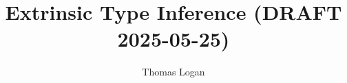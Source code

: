 \documentclass[acmsmall]{acmart}
\title{Extrinsic Type Inference (DRAFT 2025-05-25)}
\author{Thomas Logan}
\newcounter{pdc}
\newcounter{sdc}
\theoremstyle{definition}
\begin{document}
\newcommand{\pdc}{\stepcounter{pdc}\arabic{pdc}}
\newcommand{\sdc}{\stepcounter{sdc}\arabic{sdc}}

\newcommand{\Par}[1]{\paragraph{\textbf{#1}}}
\newcommand*{\code}{\fontfamily{pcr}\selectfont}
\newcommand{\J}[1]{\texttt{\code #1}}
\newcommand{\lab}[1]{\text{\color{Gray}\ [#1]}}
\newcommand{\entails}{\vdash}
\newcommand{\satisfies}{\vDash}
\newcommand{\given}{\dashv}
\newcommand{\with}{\ \diamond\ }
\newcommand{\notfree}{\ \#\ }
\newcommand{\consis}{\ \star}
\newcommand{\safe}{\ \checkmark}
\newcommand{\relational}{\ \Re}


\newcommand{\pass}{\text{\normalsize \color{Green} \ding{51}}}
\newcommand{\assisted}{\text{\normalsize \color{Purple} \ding{45}}}
\newcommand{\fail}{\text{\normalsize \color{red} \ding{55}}}

\newcommand{\unique}{\ \dagger}

\newcommand{\factorsinto}{\Vvdash}


\newcommand{\allsafe}{\ \Re\checkmark}

\newcommand{\qua}{\ .\ }



\newcommand{\ignore}{\varnothing}
\newcommand{\dTheta}{\dot{\Theta}}
\newcommand{\closed}{\bullet}
\newcommand{\local}{\blacktriangle}
\newcommand{\open}{\circ}



\newcommand{\up}{\ \land\ }
\newcommand{\down}{\ \lor\ }


\newcommand{\multi}[1]{\widebar{\ #1\ }}
\newcommand{\hastype}{:}
\newcommand{\pattype}{\ \lozenge\ }
\newcommand{\liftfun}{:}

\newcommand{\sz}[1]{\text{\small #1}}

\newcommand{\R}[1]{\color{teal}\ \ [\emph{#1}]}
 
\newcommand{\subtypes}{<:}
\newcommand{\supertypes}{:>}
\newcommand{\I}{\hspace{4mm}}
\newcommand{\Z}{.\hspace{4mm}}
\newcommand{\Alpha}{\mathrm{A}}
\newcommand{\Tau}{\mathrm{T}}
\newcommand{\B}[1]{\textbf{#1}}
\newcommand{\F}[1]{\text{#1}}
\newcommand{\bigand}{\bigwedge\nolimits}
\newcommand{\bigor}{\bigvee\nolimits}
\newcommand{\C}[1]{\color{teal} \rhd\ \emph{#1}}
\newcommand{\com}[1]{\color{Gray}\I \emph{#1}}
\newcommand{\D}[1]{\small \textsc{#1}}
\newcommand{\FIG}[1]{Fig. {\color{red} \ref{#1}}}
\newcommand{\TODO}[1]{\noindent \B{\color{red} TODO: #1}}
\end{document}
